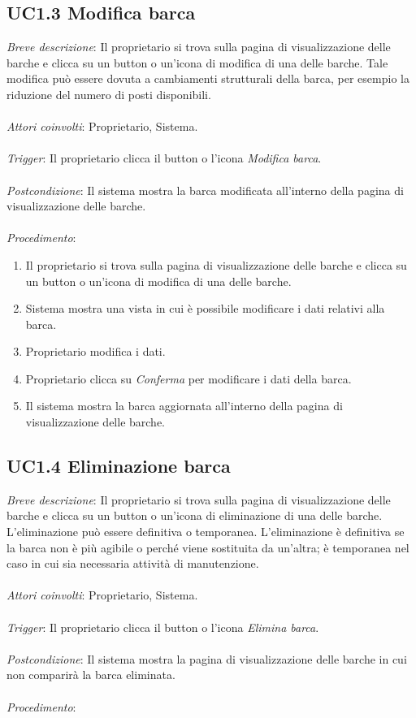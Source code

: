 \subsection{UC1.3 Modifica barca}

\emph{Breve descrizione}: Il proprietario si trova sulla pagina di visualizzazione delle barche e clicca su un button o un'icona di modifica di una delle barche.
Tale modifica può essere dovuta a cambiamenti strutturali della barca, per esempio la riduzione del numero di posti disponibili.
\\\\
\emph{Attori coinvolti}: Proprietario, Sistema.\\\\
\emph{Trigger}: Il proprietario clicca il button o l'icona \textit{Modifica barca}.\\\\
\emph{Postcondizione}: Il sistema mostra la barca modificata all'interno della pagina di visualizzazione delle barche.\\\\
\emph{Procedimento}:

\begin{enumerate}
    \item Il proprietario si trova sulla pagina di visualizzazione delle barche e clicca su un button o un'icona di modifica di una delle barche.
    \item Sistema mostra una vista in cui è possibile modificare i dati relativi alla barca.
    \item Proprietario modifica i dati.
    \item Proprietario clicca su \textit{Conferma} per modificare i dati della barca.
    \item Il sistema mostra la barca aggiornata all'interno della pagina di visualizzazione delle barche.
\end{enumerate}

\subsection{UC1.4 Eliminazione barca}

\emph{Breve descrizione}: Il proprietario si trova sulla pagina di visualizzazione delle barche e clicca su un button o un'icona di eliminazione di una delle barche.
L'eliminazione può essere definitiva o temporanea. L'eliminazione è definitiva se la barca non è più agibile o perché viene sostituita da un'altra;
è temporanea nel caso in cui sia necessaria attività di manutenzione.\\\\
\emph{Attori coinvolti}: Proprietario, Sistema.\\\\
\emph{Trigger}: Il proprietario clicca il button o l'icona \textit{Elimina barca}.\\\\
\emph{Postcondizione}: Il sistema mostra la pagina di visualizzazione delle barche in cui non comparirà la barca eliminata.\\\\
\emph{Procedimento}:


